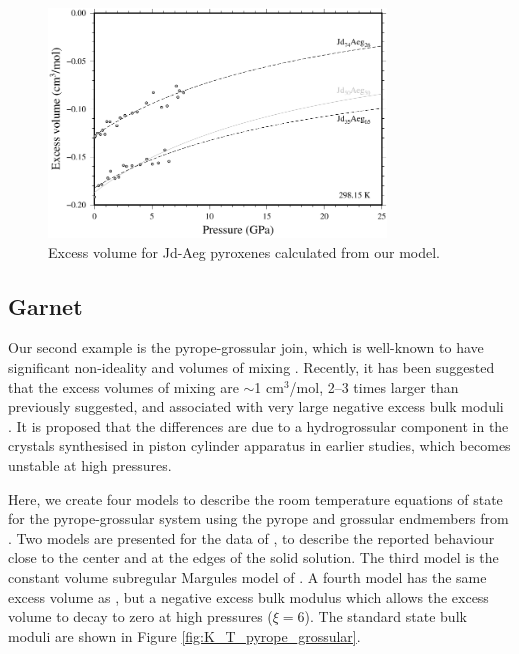 \documentclass[review]{elsarticle}
\begin{document}
\begin{figure}[ht!]
  \centering
  \includegraphics[width=0.8\textwidth]{figures/jadeite_aegirine_Vex}
  \caption{Excess volume for Jd-Aeg pyroxenes calculated from our model.}
  \label{fig:excess_volume_jadeite_aegirine}
\end{figure}

\clearpage
\subsection{Garnet}
Our second example is the pyrope-grossular join, which is well-known to have significant non-ideality and volumes of mixing \citep{NCK1977, BG1997, GCT1996}. Recently, it has been suggested that the excess volumes of mixing are $\sim$1 cm$^3$/mol, 2--3 times larger than previously suggested, and associated with very large negative excess bulk moduli \citep{DCW2015}. It is proposed that the differences are due to a hydrogrossular component in the crystals synthesised in piston cylinder apparatus in earlier studies, which becomes unstable at high pressures.

Here, we create four models to describe the room temperature equations of state for the pyrope-grossular system using the pyrope and grossular endmembers from \cite{HP2011}. Two models are presented for the data of \citep{DCW2015}, to describe the reported behaviour close to the center and at the edges of the solid solution. The third model is the constant volume subregular Margules model of \cite{GCT1996}. A fourth model has the same excess volume as \cite{GCT1996}, but a negative excess bulk modulus which allows the excess volume to decay to zero at high pressures ($\xi=6$). The standard state bulk moduli are shown in Figure \ref{fig:K_T_pyrope_grossular}.
\end{document}
